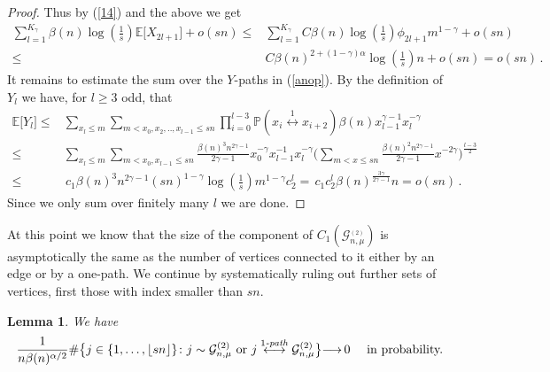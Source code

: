 \documentclass[12pt,a4paper]{article}
\numberwithin{equation}{section}
\newtheorem{lemma}[shared]{Lemma}
\begin{document}
\begin{proof}
    Thus by (\ref{14}) and the above we get
    \begin{align*}
           \sum_{l=1}^{K_\gamma} \beta(n)\log(\tfrac1s) \mathbb E\big[X_{2l+1}\big] + o(sn)
          \le &  \sum_{l=1}^{K_\gamma} C\beta(n)\log(\tfrac1s)\phi_{2l+1}m^{1-\gamma} + o(sn) \\
          \le & C\beta(n)^{2+(1-\gamma)\alpha}\log(\tfrac1s) n +o(sn)=o(sn)\,.
    \end{align*}
    It remains to estimate the sum over the $Y$-paths in (\ref{anop}). By the definition of $Y_l$ we have, for $l\ge 3$ odd, that 
    \begin{align*}
          \mathbb E\big[Y_l\big]\le &\sum_{x_l\le m}\sum_{m<x_0,x_2,..,x_{l-1}\le sn }\prod_{i=0}^{l-3}\mathbb P(x_i\overset{1}{\longleftrightarrow}x_{i+2})\beta(n)x_{l-1}^{\gamma-1}x_l^{-\gamma}
          \\\le &\sum_{x_l\le m}\sum_{m<x_0,x_{l-1}\le sn}\frac{\beta(n)^3n^{2\gamma-1}}{2\gamma-1}x_0^{-\gamma}x_{l-1}^{-1}x_l^{-\gamma}\Big(\sum_{m<x\le sn}\frac{\beta(n)^2n^{2\gamma-1}}{2\gamma-1}x^{-2\gamma}\Big)^{\tfrac{l-3}{2}}
           \\\le &\,c_1\beta(n)^3n^{2\gamma-1}(sn)^{1-\gamma}\log(\tfrac1s)m^{1-\gamma} c^l_2 = \,c_1 c_2^l \beta(n)^{\tfrac{3\gamma}{2\gamma-1}}n =o(sn)\,.
    \end{align*}
    Since we only sum over finitely many $l$ we are done.
\end{proof}

At this point we know that the size of the component of $C_1(\mathscr G_{n,\mu}^{_{(2)}})$ is asymptotically the same as the number of vertices connected to it either by an edge or by a one-path. We continue by systematically ruling out further sets of vertices, first those
with index smaller than $sn$. %

\begin{lemma} \label{3.12}
We have
    \begin{align*}
        \frac{1}{n\beta(n)^{\alpha/2}}\#
        \big\{ j \in \{1,\ldots, \lfloor sn
        \rfloor \}  \colon j \sim \mathcal G^{(2)}_{n,\mu} \text{ or }
        j \overset{1\text{\emph{-path}}}{\longleftrightarrow} \mathcal G^{(2)}_{n,\mu} \big\}
        {\longrightarrow} \, 0\quad \text{ in probability.}
    \end{align*}
\end{lemma}
\end{document}
